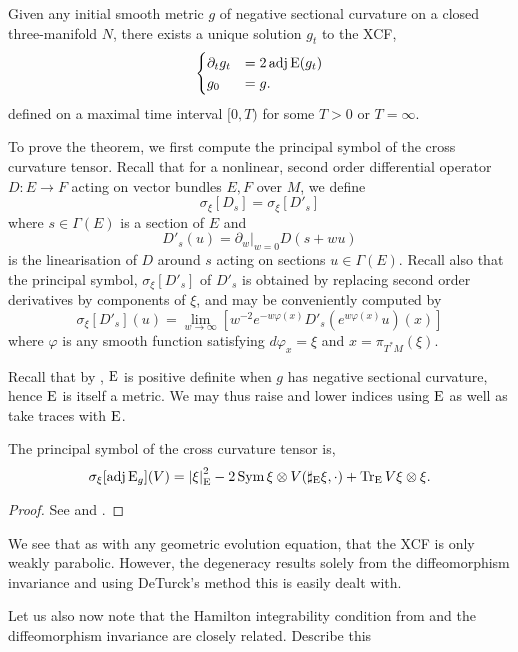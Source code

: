 \documentclass[a4paper, 12pt]{amsart}
\begin{document}
\begin{thm}
\label{thm:xcf_existence_uniqueness}
Given any initial smooth metric \(g\) of negative sectional curvature on a closed three-manifold \(N\), there exists a unique solution \(g_t\) to the XCF,
\[
\begin{cases}
\partial_t g_t &= 2\operatorname{adj}\operatorname{E}(g_t) \\
g_0 &= g.
\end{cases}
\]
defined on a maximal time interval \([0, T)\) for some \(T > 0\) or \(T = \infty\).
\end{thm}

To prove the theorem, we first compute the principal symbol of the cross curvature tensor. Recall that for a nonlinear, second order differential operator \(D : E \to F\) acting on vector bundles \(E, F\) over \(M\), we define
\begin{equation}
\label{eq:symbol}
\sigma_{\xi} [D_s] = \sigma_{\xi} [D'_s]
\end{equation}
where \(s \in \Gamma(E)\) is a section of \(E\) and
\[
D'_s (u) = \partial_w|_{w=0} D(s + w u)
\]
is the linearisation of \(D\) around \(s\) acting on sections \(u \in \Gamma(E)\). Recall also that the principal symbol, \(\sigma_{\xi} [D'_s]\) of \(D'_s\) is obtained by replacing second order derivatives by components of \(\xi\), and may be conveniently computed by
\begin{equation}
\label{eq:symbol_compute}
\sigma_{\xi} [D'_s] (u) = \lim_{w\to \infty} \left[w^{-2} e^{-w\varphi(x)} D'_s (e^{w\varphi(x)} u)(x)\right]
\end{equation}
where \(\varphi\) is any smooth function satisfying \(d\varphi_x = \xi\) and \(x = \pi_{T^{\ast}M} (\xi)\).

Recall that by , \(\operatorname{E}\) is positive definite when \(g\) has negative sectional curvature, hence \(\operatorname{E}\) is itself a metric. We may thus raise and lower indices using \(\operatorname{E}\) as well as take traces with \(\operatorname{E}\).

\begin{lemma}
\label{lem:xcf_symbol}
The principal symbol of the cross curvature tensor is,
\[
\sigma_{\xi} [\operatorname{adj}\operatorname{E}_g] (V) = \left\lvert{\xi}\right\rvert^2_{\operatorname{E}} - 2 \operatorname{Sym} \xi \otimes V(\sharp_{\operatorname{E}}\xi, \cdot) + \operatorname{Tr}_{\operatorname{E}} V \xi \otimes \xi.
\]
\end{lemma}
\begin{proof}
See \cite[Lemma 4]{MR2055396} and \cite[Theorem 1]{MR2207496}.
\end{proof}

\begin{rem}
\label{rem:invariance_integrability}
We see that as with any geometric evolution equation, that the XCF is only weakly parabolic. However, the degeneracy results solely from the diffeomorphism invariance and using DeTurck's method this is easily dealt with.

Let us also now note that the Hamilton integrability condition from  and the diffeomorphism invariance are closely related. {\color{red} Describe this}
\end{rem}
\end{document}
